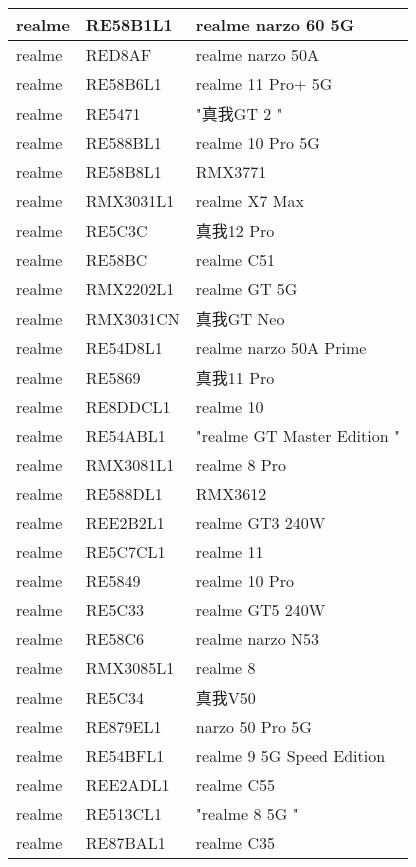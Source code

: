 \begin{tabularx}{\linewidth}{|l|X|X|}
        realme & RE58B1L1 & realme narzo 60 5G \\ \hline
        realme & RED8AF & realme narzo 50A \\ \hline
        realme & RE58B6L1 & realme 11 Pro+ 5G \\ \hline
        realme & RE5471 & "真我GT 2	" \\ \hline
        realme & RE588BL1 & realme 10 Pro 5G \\ \hline
        realme & RE58B8L1 & RMX3771 \\ \hline
        realme & RMX3031L1 & realme  X7 Max \\ \hline
        realme & RE5C3C & 真我12 Pro \\ \hline
        realme & RE58BC & realme C51 \\ \hline
        realme & RMX2202L1 & realme GT 5G \\ \hline
        realme & RMX3031CN & 真我GT Neo \\ \hline
        realme & RE54D8L1 & realme narzo 50A Prime \\ \hline
        realme & RE5869 & 真我11 Pro \\ \hline
        realme & RE8DDCL1 & realme 10 \\ \hline
        realme & RE54ABL1 & "realme GT Master Edition	" \\ \hline
        realme & RMX3081L1 & realme 8 Pro \\ \hline
        realme & RE588DL1 & RMX3612 \\ \hline
        realme & REE2B2L1 & realme GT3 240W \\ \hline
        realme & RE5C7CL1 & realme 11 \\ \hline
        realme & RE5849 & realme 10 Pro \\ \hline
        realme & RE5C33 & realme GT5 240W \\ \hline
        realme & RE58C6 & realme narzo N53 \\ \hline
        realme & RMX3085L1 & realme 8 \\ \hline
        realme & RE5C34 & 真我V50 \\ \hline
        realme & RE879EL1 & narzo 50 Pro 5G \\ \hline
        realme & RE54BFL1 & realme 9 5G Speed Edition \\ \hline
        realme & REE2ADL1 & realme C55 \\ \hline
        realme & RE513CL1 & "realme 8 5G	" \\ \hline
        realme & RE87BAL1 & realme C35 \\ \hline

\end{tabularx}

